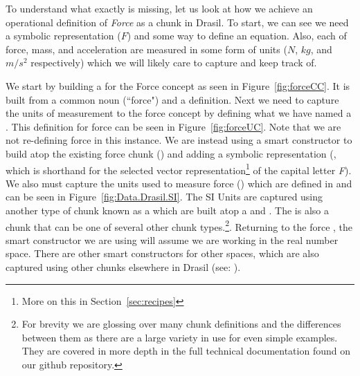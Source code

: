 To understand what exactly is missing, let us look at how we achieve an 
operational definition of \emph{Force} as a chunk in Drasil. To start, we can 
see we need a symbolic representation ($F$) and some way to define an equation. 
Also, each of force, mass, and acceleration are measured in some form of units 
($N$, $kg$, and $m/s^2$ respectively) which we will likely care to capture and 
keep track of. 




We start by building a  for the Force concept as seen in 
Figure~\ref{fig:forceCC}. It is built from a common noun (``force") and a 
definition. Next we need to capture the units of measurement to the force 
concept by defining what we have named a . This definition 
for force can be seen in Figure~\ref{fig:forceUC}. Note that we are not 
re-defining force in this instance. We are instead using a smart constructor to 
build atop the existing force chunk () and adding a symbolic 
representation (, which is shorthand for the selected vector 
representation\footnote{More on this in Section~\ref{sec:recipes}} of the 
capital letter \emph{F}). We also must capture the units used to measure force
() which are defined in  and can be 
seen in Figure~\ref{fig:Data.Drasil.SI}. The SI Units are captured using 
another type of chunk known as a  which are built atop a 
 and . The  is also a 
chunk that can be one of several other chunk types.\footnote{For brevity we are 
glossing over many chunk definitions and the differences between them as there 
are a large variety in use for even simple examples. They are covered in more 
depth in the full technical documentation found on our github repository.}. 
Returning to the force , the smart constructor  we 
are using will assume we are working in the real number space. There are 
other smart constructors for other spaces, which are also captured using other 
chunks elsewhere in Drasil (see: ).

